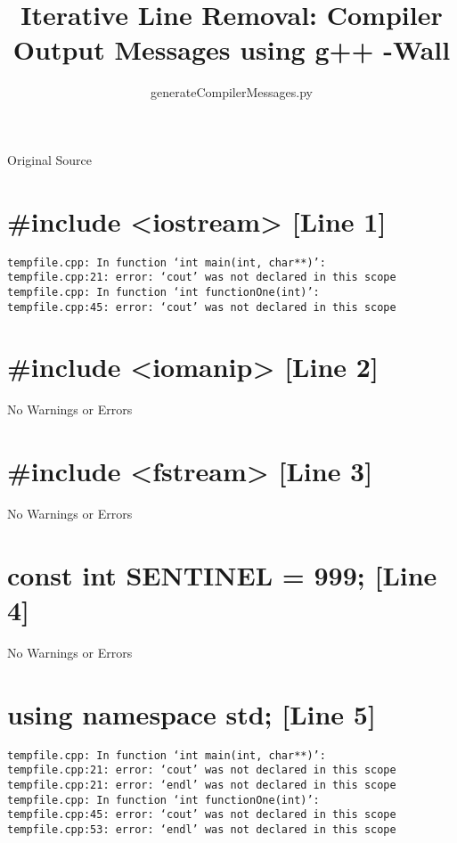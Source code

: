 \documentclass{article}
\author{generateCompilerMessages.py}
\title{Iterative Line Removal: Compiler Output Messages using g++ -Wall}
\begin{document}
\maketitle
\tableofcontents
\newpage
		
\begin{center}
\large{Original Source}
\end{center}
\lstset{numbers=left}

\newpage
\section{\#include <iostream> [Line 1]}
\begin{verbatim}
tempfile.cpp: In function ‘int main(int, char**)’:
tempfile.cpp:21: error: ‘cout’ was not declared in this scope
tempfile.cpp: In function ‘int functionOne(int)’:
tempfile.cpp:45: error: ‘cout’ was not declared in this scope

\end{verbatim}



\section{\#include <iomanip> [Line 2]}
No Warnings or Errors



\section{\#include <fstream> [Line 3]}
No Warnings or Errors



\section{const int SENTINEL = 999; [Line 4]}
No Warnings or Errors



\section{using namespace std; [Line 5]}
\begin{verbatim}
tempfile.cpp: In function ‘int main(int, char**)’:
tempfile.cpp:21: error: ‘cout’ was not declared in this scope
tempfile.cpp:21: error: ‘endl’ was not declared in this scope
tempfile.cpp: In function ‘int functionOne(int)’:
tempfile.cpp:45: error: ‘cout’ was not declared in this scope
tempfile.cpp:53: error: ‘endl’ was not declared in this scope

\end{verbatim}
\end{document}
